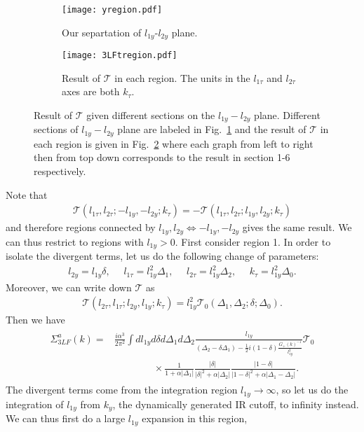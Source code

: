 \documentclass[prx,amsmath,amssymb, notitlepage, onecolumn,
nofootinbib,
superscriptaddress,
longbibliography
]{revtex4-1}
\newcommand{\mc}[1]{\mathcal{#1}}
\newcommand{\beq}{\begin{eqnarray}}
\newcommand{\eeq}{\end{eqnarray}}
\begin{document}
\begin{figure}
     \centering
     \begin{subfigure}[h]{0.35\textwidth}
         \centering
         \texttt{[image: yregion.pdf]}
         \caption{Our separtation of $l_{1y}$-$l_{2y}$ plane.}
         \label{fig: yregion}
     \end{subfigure}
     \hfill
     \begin{subfigure}[h]{0.63\textwidth}
         \centering
         \texttt{[image: 3LFtregion.pdf]}
         \caption{Result of $\mc{T}$ in each region. The units in the $l_{1\tau}$ and $l_{2\tau}$ axes are both $k_\tau$.}
         \label{fig: 3LFtregion}
     \end{subfigure}
        \caption{Result of $\mc{T}$ given different sections on the $l_{1y}-l_{2y}$ plane. Different sections of $l_{1y}-l_{2y}$ plane are labeled in Fig.~\ref{fig: yregion} and the result of $\mc{T}$ in each region is given in Fig.~\ref{fig: 3LFtregion} where each graph from left to right then from top down corresponds to the result in section 1-6 respectively.
        }
        \label{fig: 3LF graphs}
\end{figure}
Note that
\beq
\mathcal{T}(l_{1\tau}, l_{2\tau}; -l_{1y}, -l_{2y}; k_\tau) = -\mathcal{T}(l_{1\tau}, l_{2\tau}; l_{1y}, l_{2y}; k_\tau)
\eeq
and therefore regions connected by $l_{1y}, l_{2y} \Longleftrightarrow -l_{1y}, -l_{2y}$ gives the same result. 
We can thus restrict to regions with $l_{1y} > 0$. First consider region 1. In order to isolate the divergent terms, let us do the following change of parameters: 
\beq
l_{2y} = l_{1y}\delta,~~~~~~l_{1\tau} = l_{1y}^{2}\Delta_1,~~~~~~l_{2\tau} = l_{1y}^{2}\Delta_2,~~~~~~k_\tau = l_{1y}^{2}\Delta_0.
\eeq
Moreover, we can write down $\mathcal{T}$ as
\beq
\mathcal{T}(l_{2\tau}, l_{1\tau}; l_{2y}, l_{1y}; k_\tau) = l_{1y}^{2}\mathcal{T}_0(\Delta_1, \Delta_2;\delta; \Delta_0).
\eeq
Then we have
\beq
\begin{split}
\Sigma_{3LF}^a(k) = &\frac{i \alpha^3}{2\pi^2}\int dl_{1y} d\delta d\Delta_1 d\Delta_2 
\frac{l_{1y}}{(\Delta_2-\delta \Delta_1) -\frac{1}{2}i(1-\delta)\frac{G_+(k)^{-1}}{l_{1y}^2}}\mathcal{T}_0\\
&\quad\quad\quad\quad\times\frac{1}{1 + \alpha|\Delta_1|}\frac{|\delta|}{|\delta|^{2} + \alpha|\Delta_2|}\frac{|1-\delta|}{|1-\delta|^{2} + \alpha|\Delta_1-\Delta_2|}.
\end{split}
\eeq
The divergent terms come from the integration region $l_{1y}\rightarrow\infty$, so let us do the integration of $l_{1y}$ from $k_y$, the dynamically generated IR cutoff, to infinity instead. We can thus first do a large $l_{1y}$ expansion in this region,
\end{document}
